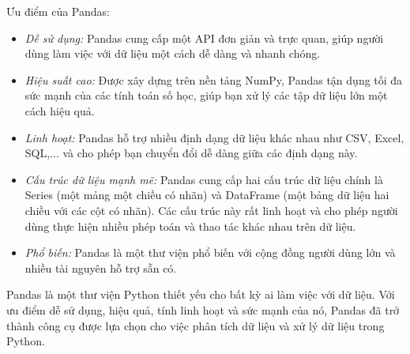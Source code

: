 Ưu điểm của Pandas:
\begin{itemize}
    \item \textit{Dễ sử dụng:} Pandas cung cấp một API đơn giản và trực quan, giúp người dùng làm việc với dữ liệu một cách dễ dàng và nhanh chóng.
    \item \textit{Hiệu suất cao:} Được xây dựng trên nền tảng NumPy, Pandas tận dụng tối đa sức mạnh của các tính toán số học, giúp bạn xử lý các tập dữ liệu lớn một cách hiệu quả.
    \item \textit{Linh hoạt:} Pandas hỗ trợ nhiều định dạng dữ liệu khác nhau như CSV, Excel, SQL,... và cho phép bạn chuyển đổi dễ dàng giữa các định dạng này.
    \item \textit{Cấu trúc dữ liệu mạnh mẽ:} Pandas cung cấp hai cấu trúc dữ liệu chính là Series (một mảng một chiều có nhãn) và DataFrame (một bảng dữ liệu hai chiều với các cột có nhãn). Các cấu trúc này rất linh hoạt và cho phép người dùng thực hiện nhiều phép toán và thao tác khác nhau trên dữ liệu.
    \item \textit{Phổ biến:} Pandas là một thư viện phổ biến với cộng đồng người dùng lớn và nhiều tài nguyên hỗ trợ sẵn có.
\end{itemize}

Pandas là một thư viện Python thiết yếu cho bất kỳ ai làm việc với dữ liệu. Với ưu điểm dễ sử dụng, hiệu quả, tính linh hoạt và sức mạnh của nó, Pandas đã trở thành công cụ được lựa chọn cho việc phân tích dữ liệu và xử lý dữ liệu trong Python.

